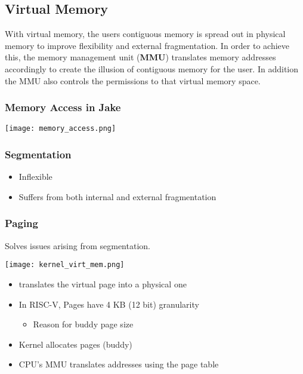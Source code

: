 \subsection{Virtual Memory}
With virtual memory, the users contiguous memory is spread out in physical memory to improve flexibility and external fragmentation.
In order to achieve this, the memory management unit (\textbf{MMU}) translates memory addresses accordingly to create the illusion of contiguous memory for the user. In addition the MMU also controls the permissions to that virtual memory space.

\subsubsection{Memory Access in Jake}
\begin{center}
    \texttt{[image: memory\_access.png]}
\end{center}

\subsubsection{Segmentation}

\begin{itemize}
    \item Inflexible
    \item Suffers from both internal and external fragmentation
\end{itemize}

\subsubsection{Paging}
Solves issues arising from segmentation.

\begin{center}
    \texttt{[image: kernel\_virt\_mem.png]}
\end{center}

\begin{itemize}
    \item translates the virtual page into a physical one
    \item In RISC-V, Pages have 4 KB (12 bit) granularity
          \begin{itemize}
              \item Reason for buddy page size
          \end{itemize}
    \item Kernel allocates pages (buddy)
    \item CPU's MMU translates addresses using the page table
\end{itemize}


